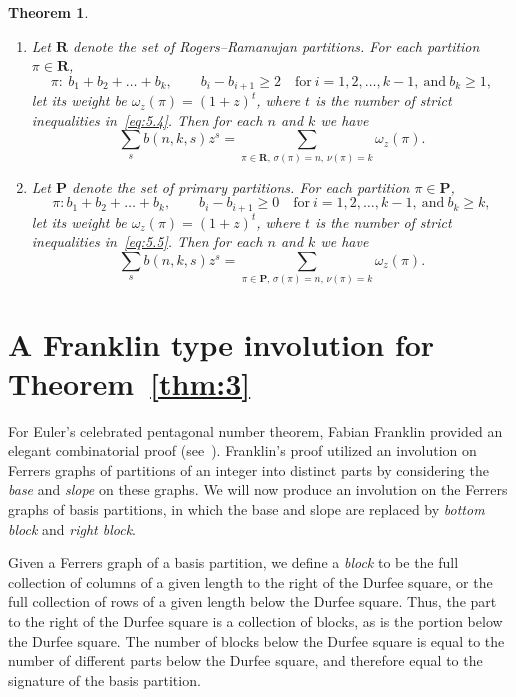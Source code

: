 \documentclass[10pt,a4paper]{amsart}
\numberwithin{equation}{section}
\newtheorem{Theorem}{Theorem}[section]
\theoremstyle{definition}
\begin{document}
\begin{Theorem}\label{thm:4}\quad
\begin{enumerate}\itemsep=0pt
\item[$(i)$]
Let $\mathbf{R}$ denote the set of Rogers--Ramanujan partitions. For
each partition $\pi\in \mathbf{R}$,
\begin{equation}
\pi\colon\ b_1+b_2+\dots +b_k, \qquad b_i-b_{i+1}\ge 2 \quad \text{for} \
i=1,2,\dots , k-1, \ \text{and} \ b_k\ge 1,\label{eq:5.4}
\end{equation}
let its weight be $\omega_z(\pi)=(1+z)^t$, where $t$ is the number of strict inequalities in~\eqref{eq:5.4}. Then for each $n$ and $k$ we have
\[
\sum_sb(n,k,s)z^s=\sum_{\pi\in \mathbf{R},\, \sigma(\pi)=n,\, \nu(\pi)=k}\omega_z(\pi).
\]
\item[$(ii)$]
Let $\mathbf{P}$ denote the set of primary partitions. For
each partition $\pi\in \mathbf{P}$,
\begin{equation}
\pi\colon b_1+b_2+\dots +b_k, \qquad b_i-b_{i+1}\ge 0 \quad \text{for} \
i=1,2,\dots , k-1, \ \text{and} \ b_k\ge k, \label{eq:5.5}
\end{equation}
let its weight be $\omega_z(\pi)=(1+z)^t$, where $t$ is the
number of strict inequalities in~\eqref{eq:5.5}. Then for each $n$ and $k$ we have
\[
\sum_sb(n,k,s)z^s=\sum_{\pi\in \mathbf{P},\, \sigma(\pi)=n,\, \nu(\pi)=k}\omega_z(\pi).
\]
\end{enumerate}
\end{Theorem}


\section{A Franklin type involution for Theorem~\ref{thm:3}}\label{section6}

For Euler's celebrated pentagonal number theorem, Fabian Franklin provided
an elegant combinatorial proof (see~\cite{An-book}). Franklin's proof utilized an
involution on Ferrers graphs of partitions of an integer into distinct
parts by considering the {\it base} and {\it slope} on these graphs.
We will now produce an involution on the Ferrers graphs of basis partitions,
in which the base and slope are replaced by {\it bottom block} and
{\it right block}.

Given a Ferrers graph of a basis partition, we define a {\it block} to be
the full collection of columns of a given length to the right of
the Durfee square, or the full collection of rows of a given length
below the Durfee square. Thus, the part to the right of the Durfee
square is a collection of blocks, as is the portion below the Durfee
square. The number of blocks below the Durfee square is equal to the
number of different parts below the Durfee square, and therefore equal
to the signature of the basis partition.
\end{document}
